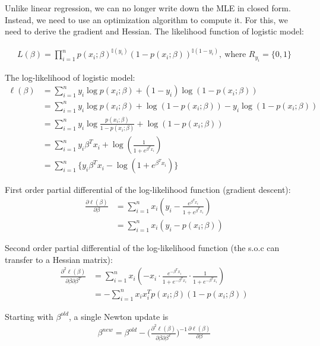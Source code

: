 \documentclass[12pt,a4paper]{article}%
\theoremstyle{definition}
\theoremstyle{plain}
\numberwithin{equation}{section}
\begin{document}
Unlike linear regression, we can no longer write down the MLE in closed form.
Instead, we need to use an optimization algorithm to compute it.
For this, we need to derive the gradient and Hessian. The likelihood function of logistic model:

\begin{gather}
L(\beta) = \prod_{i=1}^{n} p(x_{i};\beta)^{\mathbb{I}(y_{i})} (1-p(x_{i};\beta))^{ \mathbb{I}(1-y_{i}) },~\text{where~} R_{y_{i}}=\{0,1\}
\end{gather}

The log-likelihood of logistic model:
\begin{align*}
\ell(\beta)& = \sum\limits_{i=1}^{n} y_{i} \log p(x_{i};\beta)+(1-y_{i})\log (1-p(x_{i};\beta)) \\
		   & = \sum\limits_{i=1}^{n} y_{i} \log p(x_{i};\beta) + \log (1-p(x_{i};\beta)) - y_{i} \log (1-p(x_{i};\beta))\\
		   & = \sum\limits_{i=1}^{n} y_{i} \log \frac{p(x_{i};\beta)}{1-p(x_{i};\beta)} + \log (1-p(x_{i};\beta))  \\
		   & = \sum\limits_{i=1}^{n} y_{i}\beta^{T}x_{i}+ \log (\frac{1}{1+e^{\beta^{T}x_{i}}}) \\
 		   & = \sum\limits_{i=1}^{n} \{y_{i}\beta^{T}x_{i}-\log (1+e^{\beta^{T}x_{i}})\}
\end{align*}

First order partial differential of the log-likelihood function (gradient descent):
\begin{align*}
\frac{\partial \ell(\beta)}{\partial \beta} & = \sum\limits_{i=1}^{n} x_{i}(y_{i} - \frac{e^{\beta^{T}x_{i}}}{1+e^{\beta^{T}x_{i}}}) \\
 & = \sum\limits_{i=1}^{n} x_{i}(y_{i} - p(x_{i};\beta))
\end{align*}

Second order partial differential of the log-likelihood function (the s.o.c can transfer to a Hessian matrix):
\begin{align*}
\frac{\partial^{2} \ell(\beta)}{\partial \beta \partial \beta^{T}}
 & = \sum\limits_{i=1}^{n} x_{i}(-x_{i} \cdot \frac{e^{-\beta^{T} x_{i}}}{1+e^{-\beta^{T} x_{i}}} \cdot \frac{1}{1+e^{-\beta^{T} x_{i}}}) \\
 & = -\sum\limits_{i=1}^{n} x_{i}x_{i}^{T} p(x_{i};\beta) (1-p(x_{i};\beta))
\end{align*}

Starting with $\beta^{old}$, a single Newton update is
\begin{gather*}
\beta^{new} = \beta^{old} - \bigg(\frac{\partial^{2} \ell(\beta)}{\partial \beta \partial \beta^{T}}\bigg)^{-1} \frac{\partial \ell(\beta)}{\partial \beta}
\end{gather*}
\end{document}
